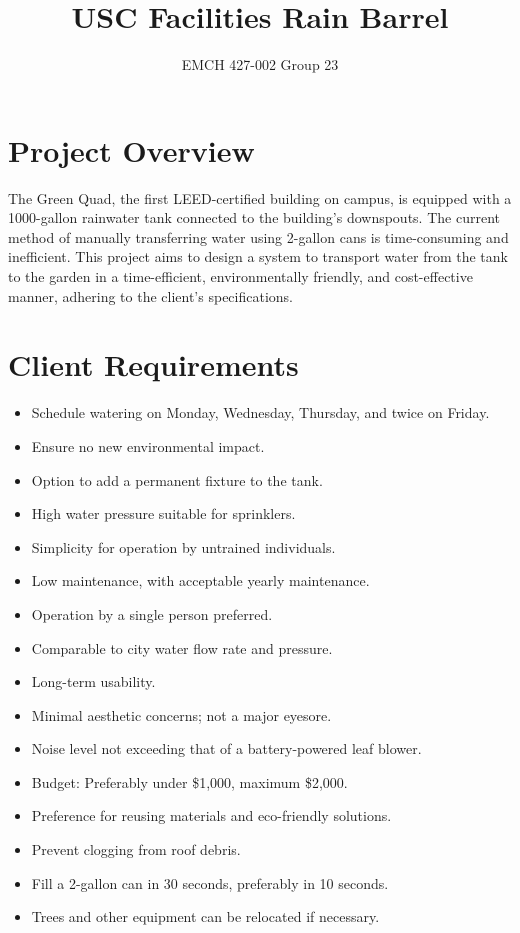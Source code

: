 \documentclass[12pt]{article}
\title{USC Facilities Rain Barrel}
\author{EMCH 427-002 Group 23}
\date{}
\begin{document}
\maketitle

\section*{Project Overview}
The Green Quad, the first LEED-certified building on campus, is equipped with a 1000-gallon rainwater tank connected to the building's downspouts. The current method of manually transferring water using 2-gallon cans is time-consuming and inefficient. This project aims to design a system to transport water from the tank to the garden in a time-efficient, environmentally friendly, and cost-effective manner, adhering to the client's specifications.

\section*{Client Requirements}
\begin{itemize}[noitemsep, topsep=0pt]
\item Schedule watering on Monday, Wednesday, Thursday, and twice on Friday.
\item Ensure no new environmental impact.
\item Option to add a permanent fixture to the tank.
\item High water pressure suitable for sprinklers.
\item Simplicity for operation by untrained individuals.
\item Low maintenance, with acceptable yearly maintenance.
\item Operation by a single person preferred.
\item Comparable to city water flow rate and pressure.
\item Long-term usability.
\item Minimal aesthetic concerns; not a major eyesore.
\item Noise level not exceeding that of a battery-powered leaf blower.
\item Budget: Preferably under \$1,000, maximum \$2,000.
\item Preference for reusing materials and eco-friendly solutions.
\item Prevent clogging from roof debris.
\item Fill a 2-gallon can in 30 seconds, preferably in 10 seconds.
\item Trees and other equipment can be relocated if necessary.
\end{itemize}
\end{document}
